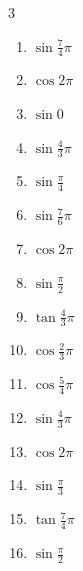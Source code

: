 \begin{multicols}{3}
\begin{enumerate}
  \item $\displaystyle \sin{\frac{7}{4}\pi}$

  \item $\displaystyle \cos{2\pi}$
        \phantom{$\displaystyle =1$}

  \item $\displaystyle \sin{0}$
        \phantom{$\displaystyle =0$}

  \item $\displaystyle \sin{\frac{4}{3}\pi}$

  \item $\displaystyle \sin{\frac{\pi}{4}}$

  \item $\displaystyle \sin{\frac{7}{6}\pi}$

  \item $\displaystyle \cos{2\pi}$
        \phantom{$\displaystyle =1$}

  \item $\displaystyle \sin{\frac{\pi}{2}}$
        \phantom{$\displaystyle =1$}

  \item $\displaystyle \tan{\frac{4}{3}\pi}$

  \item $\displaystyle \cos{\frac{2}{3}\pi}$

  \item $\displaystyle \cos{\frac{5}{4}\pi}$

  \item $\displaystyle \sin{\frac{4}{3}\pi}$

  \item $\displaystyle \cos{2\pi}$
        \phantom{$\displaystyle =1$}

  \item $\displaystyle \sin{\frac{\pi}{3}}$

  \item $\displaystyle \tan{\frac{7}{4}\pi}$
        \phantom{$\displaystyle =-1$}

  \item $\displaystyle \sin{\frac{\pi}{2}}$
        \phantom{$\displaystyle =1$}


\end{enumerate}
\end{multicols}

